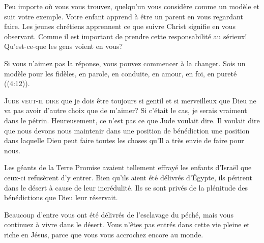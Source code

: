 Peu importe où vous vous trouvez, quelqu'un vous considère comme un modèle
 et suit votre exemple. Votre enfant apprend à être un parent en vous
 regardant faire. Les jeunes chrétiens apprennent ce que suivre Christ
 signifie en vous observant. Comme il est important de prendre
 cette responsabilité au sérieux! Qu'est-ce-que les gens voient en vous? 

Si vous n'aimez pas la réponse, vous pouvez commencer à la changer.
 \og Sois un modèle pour les fidèles, en parole, en conduite,
 en amour, en foi, en pureté \fg{} ((4:12)). 

\dvrule







\lettrine{J}{ude veut-il dire} que je dois être toujours 
 si gentil et si merveilleux que Dieu ne va pas avoir
 d'autre choix que de m'aimer?
 Si c'était le cas, je serais vraiment dans le pétrin.
 Heureusement, ce n'est pas ce que Jude voulait dire.
 Il voulait dire que nous devons nous maintenir
 dans une position de bénédiction
 \ocadr une position dans laquelle Dieu peut faire toutes les choses
 qu'Il a très envie de faire pour nous. 

Les géants de la Terre Promise avaient tellement effrayé
 les enfants d'Israël que ceux-ci refusèrent d'y entrer.
 Bien qu'ils aient été délivrés d'Égypte, 
 ils périrent dans le désert à cause de leur incrédulité.
 Ils se sont privés de la plénitude des bénédictions
 que Dieu leur réservait.


Beaucoup d'entre vous ont été délivrés de l'esclavage du péché,
 mais vous continuez à vivre dans le désert.
 Vous n'êtes pas entrés dans cette vie pleine et riche en Jésus,
 parce que vous vous accrochez encore au monde. 

